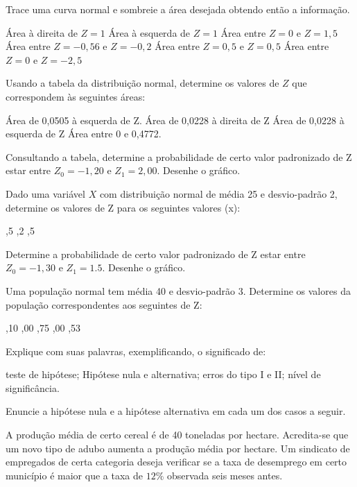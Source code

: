 \documentclass{report}
\begin{document}
\begin{Exercise}

\Question Trace uma curva normal e sombreie a área desejada obtendo então a informação.
\begin{tasks}
\task Área à direita de $Z = 1$
\task Área à esquerda de $Z = 1$
\task Área entre $Z = 0$ e $Z = 1,5$
\task Área entre $Z = -0,56$ e $Z = -0,2$
\task Área entre $Z = 0,5$ e $Z = 0,5$
\task Área entre $Z = 0$ e $Z = -2,5$
\end{tasks} 

\Question Usando a tabela da distribuição normal, determine os valores de $Z$ que correspondem às seguintes áreas:
\begin{tasks}
\task Área de 0,0505 à esquerda de Z.
\task Área de 0,0228 à direita de Z
\task Área de 0,0228 à esquerda de Z
\task Área entre 0 e 0,4772.
\end{tasks} 

\Question Consultando a tabela, determine a probabilidade de certo valor padronizado de Z estar entre $Z_{0} = -1,20$ e $Z_{1} = 2,00$. Desenhe o gráfico.

\Question Dado uma variável $X$ com distribuição normal de média 25 e desvio-padrão 2, determine os valores de Z para os seguintes valores (x):
\begin{tasks}
,5
,2
,5
\end{tasks}

\Question Determine a probabilidade de certo valor padronizado de Z estar entre $Z_{0} = -1,30$ e $Z_{1}=1.5$. Desenhe o gráfico.

\Question Uma população normal tem média 40 e desvio-padrão 3. Determine os valores da população correspondentes aos seguintes de Z:
\begin{tasks}
,10
,00
,75
,00
,53
\end{tasks}

\newpage

\Question Explique com suas palavras, exemplificando, o significado de:
\begin{tasks}
\task teste de hipótese;
\task Hipótese nula e alternativa;
\task erros do tipo I e II; 
\task nível de significância.
\end{tasks}

\Question Enuncie a hipótese nula e a hipótese alternativa em cada um dos casos a seguir.
\begin{tasks}
\task A produção média de certo cereal é de 40 toneladas por hectare. Acredita-se que um novo tipo de adubo aumenta a produção média por hectare.
\task Um sindicato de empregados de certa categoria deseja verificar se a taxa de desemprego em certo município é maior que a taxa de $12\%$ observada seis meses antes.
\end{tasks}


\end{Exercise}
\end{document}
